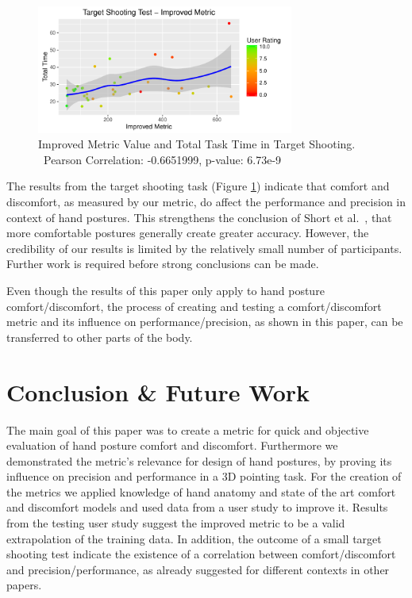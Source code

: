 \documentclass{sig-alternate-05-2015}
\begin{document}
\begin{figure}[h]
\centering
\includegraphics[width=8.45cm]{TargetShooting}
\vspace{-20pt}
\caption{Improved Metric Value and Total Task Time in Target Shooting.\\\
Pearson Correlation: -0.6651999, p-value: 6.73e-9}
\label{fig:targetShooting}
\vspace{-5pt}
\end{figure}

The results from the target shooting task (Figure \ref{fig:targetShooting}) indicate that comfort and discomfort, as measured by our metric, do affect the performance and precision in context of hand postures. This strengthens the conclusion of Short et al.~\cite{short1999precision}, that more comfortable postures generally create greater accuracy. However, the credibility of our results is limited by the relatively small number of participants. Further work is required before strong conclusions can be made.

Even though the results of this paper only apply to hand posture comfort/discomfort, the process of creating and testing a comfort/discomfort metric and its influence on performance/precision, as shown in this paper, can be transferred to other parts of the body. 

\section{Conclusion \& Future Work}
The main goal of this paper was to create a metric for quick and objective evaluation of hand posture comfort and discomfort. Furthermore we demonstrated the metric's relevance for design of hand postures, by proving its influence on precision and performance in a 3D pointing task. For the creation of the metrics we applied knowledge of hand anatomy and state of the art comfort and discomfort models and used data from a user study to improve it. Results from the testing user study suggest the improved metric to be a valid extrapolation of the training data. In addition, the outcome of a small target shooting test indicate the existence of a correlation between comfort/discomfort and precision/performance, as already suggested for different contexts in other papers.
\end{document}
